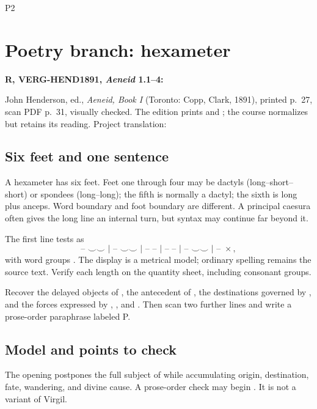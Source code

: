 \begin{courseunit}{P2}
\chapter{Poetry branch: hexameter}

\textbf{R, VERG-HEND1891, \textit{Aeneid} 1.1--4:}
\begin{quote}
\PoetryVirgilAeneidOpening
\end{quote}

John Henderson, ed., \textit{Aeneid, Book I} (Toronto: Copp, Clark, 1891),
printed p.~27, scan PDF p.~31, visually checked. The edition prints
 and ; the course normalizes  but
retains its  reading. Project translation: 

\section{Six feet and one sentence}

A hexameter has six feet. Feet one through four may be dactyls
(long--short--short) or spondees (long--long); the fifth is normally a dactyl;
the sixth is long plus anceps. Word boundary and foot boundary are different.
A principal caesura often gives the long line an internal turn, but syntax may
continue far beyond it.

The first line tests as
\[
\text{-- $\smile\smile$ | -- $\smile\smile$ | -- -- | -- -- |
-- $\smile\smile$ | -- $\times$},
\]
with word groups . The display is a metrical model; ordinary spelling remains the source
text. Verify each length on the quantity sheet, including consonant groups.

Recover the delayed objects of , the antecedent of ,
the destinations governed by , and the forces expressed by
, , and . Then scan two further lines and
write a prose-order paraphrase labeled P.

\ifsolutions
\section{Model and points to check}
The opening postpones the full subject of  while accumulating
origin, destination, fate, wandering, and divine cause. A prose-order check may
begin . It is not a variant of Virgil.
\else

\end{courseunit}
